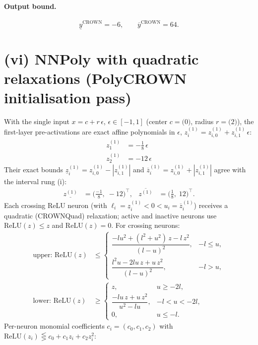 \documentclass[11pt]{article}
\begin{document}
\paragraph{Output bound.}
\begin{equation*}
\underline{y}^{\text{CROWN}} = -6, \qquad \overline{y}^{\text{CROWN}} = 64.
\end{equation*}

\section{(vi) NNPoly with quadratic relaxations (PolyCROWN initialisation pass)}
With the single input $x = c + r\,\epsilon$, $\epsilon \in [-1, 1]$ (center $c = \bigl(0\bigr)$, radius $r = \bigl(2\bigr)$), the first-layer pre-activations are exact affine polynomials in $\epsilon$, $z^{(1)}_i = z^{(1)}_{i,0} + z^{(1)}_{i,1}\,\epsilon$:
\begin{align*}
z^{(1)}_{1} &= -\frac{1}{8}\,\epsilon \\
z^{(1)}_{2} &= -12\,\epsilon
\end{align*}
Their exact bounds $\underline{z}^{(1)}_i = z^{(1)}_{i,0} - |z^{(1)}_{i,1}|$ and $\overline{z}^{(1)}_i = z^{(1)}_{i,0} + |z^{(1)}_{i,1}|$ agree with the interval rung (i):
\begin{align*}
\underline{z^{(1)}} &= \bigl(\frac{-1}{8},\; -12\bigr)^{\!\top}, & \overline{z^{(1)}} &= \bigl(\frac{1}{8},\; 12\bigr)^{\!\top}.
\end{align*}
Each crossing ReLU neuron (with $\ell_i = \underline{z}^{(1)}_i < 0 < u_i = \overline{z}^{(1)}_i$)
receives a quadratic (CROWNQuad) relaxation; active and inactive neurons use $\mathrm{ReLU}(z) \le z$
and $\mathrm{ReLU}(z) = 0$. For crossing neurons:
\begin{align*}
\text{upper: } \mathrm{ReLU}(z) &\le \begin{cases} \dfrac{-l u^2 + (l^2 + u^2)\, z - l\, z^2}{(l - u)^2}, & -l \le u, \\[3mm] \dfrac{l^2 u - 2 l u\, z + u\, z^2}{(l - u)^2}, & -l > u, \end{cases} \\[2mm]
\text{lower: } \mathrm{ReLU}(z) &\ge \begin{cases} z, & u \ge -2l, \\[3mm] \dfrac{-l u\, z + u\, z^2}{u^2 - l u}, & -l < u < -2l, \\[3mm] 0, & u \le -l. \end{cases}
\end{align*}
Per-neuron monomial coefficients $c_i = (c_0, c_1, c_2)$ with $\mathrm{ReLU}(z_i) \lesseqgtr c_0 + c_1 z_i + c_2 z_i^2$:
\end{document}
